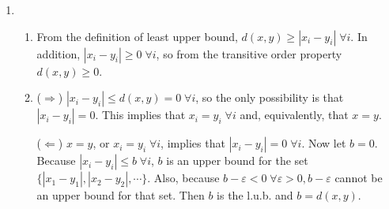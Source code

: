 \documentclass[a4paper,12pt]{article}
\begin{document}
\begin{enumerate}
\begin{enumerate}
\begin{enumerate}[label=(\roman*)]
                        \item
                            ($\Rightarrow$) If $\sum_{i = 1}^{n} |x_i - y_i| = 0$ then each term $|x_i - y_i| = 0$, which implies that $x_i = y_i \; \forall i$. This can be rewritten as $(x_1, \cdots, x_n) = (y_1, \cdots, y_n)$. \par
                            ($\Leftarrow$) $(x_1, \cdots, x_n) = (y_1, \cdots, y_n)$ means that $x_i = y_i \; \forall i$. Then $|x_i - y_i| = 0 \; \forall i$ and $\sum_{i = 1}^{n} |x_i - y_i| = 0$.

                        \item
                            $d\left( (x_1, \cdots, x_n), (y_1, \cdots, y_n) \right) = \sum_{i = 1}^{n} |x_i - y_i| = \sum_{i = 1}^{n} |y_i - x_i| = \\
                            d\left( (y_1, \cdots, y_n), (x_1, \cdots, x_n) \right)$.

                        \item
                            Let $(z_1, \cdots, z_n)$ be another $n$-tuple of real numbers. From the Triangle Inequality, $|x_i - z_i| \leq |x_i - y_i| + |y_i - z_i| \; \forall i$, so
                            $d\left( (x_1, \cdots, x_n), (z_1, \cdots, z_n) \right) = \sum_{i = 1}^{n} |x_i - z_i| \leq \sum_{i = 1}^{n} |x_i - y_i| + \sum_{i = 1}^{n} |y_i - z_i| = d\left( (x_1, \cdots, x_n), (y_1, \cdots, y_n) \right) + d\left( (y_1, \cdots, y_n), (z_1, \cdots, z_n) \right)$.
                    \end{enumerate}

                \item
                    \begin{enumerate}[label=(\roman*)]
                        \item
                            From the definition of least upper bound, $d(x, y) \geq |x_i - y_i| \; \forall i$. In addition, $|x_i - y_i| \geq 0 \; \forall i$, so from the transitive order property $d(x, y) \geq 0$.

                        \item
                            ($\Rightarrow$) $|x_i - y_i| \leq d(x, y) = 0 \; \forall i$, so the only possibility is that $|x_i - y_i| = 0$. This implies that $x_i = y_i \; \forall i$ and, equivalently, that $x = y$. \par
                            ($\Leftarrow$) $x = y$, or $x_i = y_i \; \forall i$, implies that $|x_i - y_i| = 0 \; \forall i$. Now let $b = 0$. Because $|x_i - y_i| \leq b \; \forall i$, $b$ is an upper bound for the set $\{ |x_1 - y_1|, |x_2 - y_2|, \cdots \}$. Also, because $b - \varepsilon < 0 \; \forall \varepsilon > 0, b - \varepsilon$ cannot be an upper bound for that set. Then $b$ is the l.u.b. and $b = d(x, y)$.


\end{enumerate}
\end{enumerate}
\end{enumerate}
\end{document}
